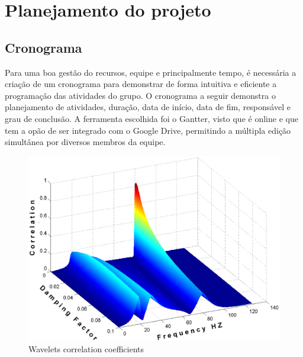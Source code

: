 \chapter[Planejamento do projeto]{Planejamento do projeto}


\section{\large{Cronograma}} 

\tab Para uma boa gestão do recursos, equipe e principalmente tempo, é necessária a criação de um cronograma para demonstrar de forma intuitiva e eficiente a programação das atividades do grupo. O cronograma a seguir demonstra o planejamento de atividades, duração, data de início, data de fim, responsável e grau de conclusão. A ferramenta escolhida foi o Gantter, visto que é online e que tem a opão de ser integrado com o Google Drive, permitindo a múltipla edição simultânea por diversos membros da equipe. \\
 
 \begin{figure}[h]
	\centering
	\label{fig01}
		\includegraphics[keepaspectratio=true,scale=0.3]{figuras/fig01.eps}
	\caption{Wavelets correlation coefficients}
\end{figure}